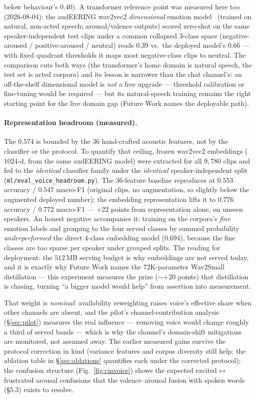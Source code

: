 \documentclass[11pt,a4paper]{article}
\begin{document}
below behaviour's $0.40$). A transformer reference point was measured here too
(2026-08-04): the audEERING wav2vec2 \emph{dimensional} emotion
model~\cite{wagner2023} (trained on
natural, non-acted speech; arousal/valence outputs) scored zero-shot on the same
speaker-independent test clips under a common collapsed 3-class space
(negative-aroused / positive-aroused / neutral) reads $0.39$ vs.\ the deployed
model's $0.66$ --- with fixed quadrant thresholds it maps most negative-class
clips to neutral. The comparison cuts both ways (the transformer's home domain is
natural speech, the test set is acted corpora) and its lesson is narrower than
the chat channel's: an off-the-shelf dimensional model is \emph{not} a free
upgrade --- threshold calibration or fine-tuning would be required --- but its
natural-speech training remains the right starting point for the live domain gap
(Future Work names the deployable path).

\paragraph{Representation headroom (measured).} The $0.574$ is bounded by the
$36$ hand-crafted acoustic features, not by the classifier or the protocol. To
quantify that ceiling, frozen wav2vec2 embeddings ($1024$-d, from the same
audEERING model) were extracted for all $9{,}780$ clips and fed to the
\emph{identical} classifier family under the \emph{identical}
speaker-independent split (\texttt{ml/eval\_voice\_headroom.py}). The 36-feature
baseline reproduces at $0.553$ accuracy / $0.547$ macro-F1 (original clips, no
augmentation, so slightly below the augmented deployed number); the embedding
representation lifts it to $\mathbf{0.776}$ accuracy / $0.772$ macro-F1 ---
$+22$ points from representation alone, on unseen speakers. An honest negative
accompanies it: training on the corpora's \emph{fine} emotion labels and
grouping to the four served classes by summed probability \emph{underperformed}
the direct 4-class embedding model ($0.694$), because the fine classes are too
sparse per speaker under grouped splits. The reading for deployment: the
$512$\,MB serving budget is why embeddings are not served today, and it is
exactly why Future Work names the $72$K-parameter Wav2Small distillation --- this
experiment measures the prize ($\sim$$+20$ points) that distillation is chasing,
turning ``a bigger model would help'' from assertion into measurement.

That weight is \emph{nominal}: availability reweighting
raises voice's effective share when other channels are absent, and the pilot's
channel-contribution analysis (\S\ref{sec:pilot}) measures the real influence ---
removing voice would change roughly a third of served bands --- which is why the
channel's domain-shift mitigations are monitored, not assumed away. The earlier measured
gains survive the protocol correction in kind (variance features and corpus
diversity still help; the ablation table in \S\ref{sec:ablations} quantifies each
under the corrected protocol); the confusion structure
(Fig.~\ref{fig:cmvoice}) shows the expected excited$\leftrightarrow$frustrated
arousal confusions that the valence--arousal fusion with spoken words (\S5.3)
exists to resolve.
\end{document}
